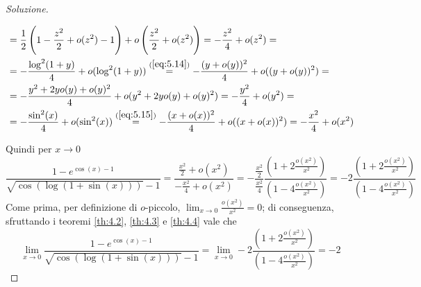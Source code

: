 \begin{proof}[Soluzione]
\begin{enumerate}[(i)]
\[\begin{split}
            & = \frac{1}{2}\left(1-\frac{z^2}{2}+o(z^2)-1\right)+o\left(\frac{z^2}{2}+o(z^2)\right) = -\frac{z^2}{4}+o(z^2) =\\
            & = -\frac{\log^2(1+y)}{4}+o(\log^2(1+y)) \overset{(\ref{eq:5.14})}{=} -\frac{(y+o(y))^2}{4} +o((y+o(y))^2) =  \\
            & = -\frac{y^2 +2yo(y)+o(y)^2}{4}+o(y^2 +2yo(y)+o(y)^2) = -\frac{y^2}{4}+o(y^2) = \\
            & = -\frac{\sin^2(x)}{4}+o(\sin^2(x)) \overset{(\ref{eq:5.15})}{=} -\frac{(x+o(x))^2}{4} + o((x+o(x))^2) = -\frac{x^2}{4}+o(x^2)
        \end{split}
        \]
    \end{enumerate}
    Quindi per $x\to 0$
    \[
    \frac{1-e^{\cos(x)-1}}{\sqrt{\cos(\log(1+\sin(x)))}-1} = \frac{\frac{x^2}{2}+o(x^2)}{-\frac{x^2}{4}+o(x^2)} = -\frac{\frac{x^2}{2}}{\frac{x^2}{4}}\frac{\left(1+2\frac{o(x^2)}{x^2}\right)}{\left(1-4\frac{o(x^2)}{x^2}\right)} = -2\frac{\left(1+2\frac{o(x^2)}{x^2}\right)}{\left(1-4\frac{o(x^2)}{x^2}\right)}
    \]
    Come prima, per definizione di $o$-piccolo, $\lim_{x\to 0} \frac{o(x^2)}{x^2} = 0$; di conseguenza, sfruttando i teoremi \ref{th:4.2}, \ref{th:4.3} e \ref{th:4.4} vale che
    \[
    \lim_{x\to 0} \frac{1-e^{\cos(x)-1}}{\sqrt{\cos(\log(1+\sin(x)))}-1} = \lim_{x\to 0}-2\frac{\left(1+2\frac{o(x^2)}{x^2}\right)}{\left(1-4\frac{o(x^2)}{x^2}\right)} = -2
    \]
\end{proof}
